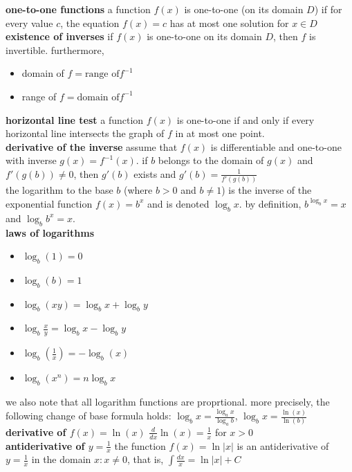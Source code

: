 \documentclass{article}
\begin{document}
\textbf{one-to-one functions} a function $f(x)$ is one-to-one (on its domain $D$) if for every value $c$, the equation $f(x) = c$ has at most one solution for $x \in D$\\

\textbf{existence of inverses} if $f(x)$ is one-to-one on its domain $D$, then $f$ is invertible. furthermore,
	\begin{itemize}
		\item domain of $f = \text{range of} f^{-1}$
		\item range of $f = \text{domain of} f^{-1}$ 
	\end{itemize}

\textbf{horizontal line test} a function $f(x)$ is one-to-one if and only if every horizontal line intersects the graph of $f$ in at most one point.\\

\textbf{derivative of the inverse} assume that $f(x)$ is differentiable and one-to-one with inverse $g(x) = f^{-1}(x)$. if $b$ belongs to the domain of $g(x)$ and $f'(g(b)) \neq 0$, then $g'(b)$ exists and $g'(b) = \frac{1}{f'(g(b))}$\\

the logarithm to the base $b$ (where $b > 0$ and $b \neq 1$) is the inverse of the exponential function $f(x) = b^x$ and is denoted $\log_{b}x$. by definition, $b^{\log_{b}x} = x$ and $\log_{b}b^x = x$.\\

\textbf{laws of logarithms}
	\begin{itemize}
		\item $\log_{b}(1) = 0$
		\item $\log_{b}(b) = 1$
		\item $\log_{b}(xy) = \log_{b}x + \log_{b}y$
		\item $\log_{b}\frac{x}{y} = \log_{b}x - \log_{b}y$
		\item $\log_{b}(\frac{1}{x}) = -\log_{b}(x)$
		\item $\log_{b}(x^n) = n\log_{b}x$
	\end{itemize}
we also note that all logarithm functions are proprtional. more precisely, the following change of base formula holds: $\log_{b}x = \frac{\log_{a}x}{\log_{a}b}$, $\log_{b}x = \frac{\ln(x)}{\ln(b)}$\\

\textbf{derivative of $f(x) = \ln(x)$} $\frac{d}{dx}\ln(x) = \frac{1}{x}$ for $x > 0$\\

\textbf{antiderivative of $y = \frac{1}{x}$} the function $f(x) = \ln \lvert x\rvert$ is an antiderivative of $y = \frac{1}{x}$ in the domain ${x : x \neq 0}$, that is, $\int\frac{dx}{x} = \ln \lvert x \rvert + C$\\
\end{document}
